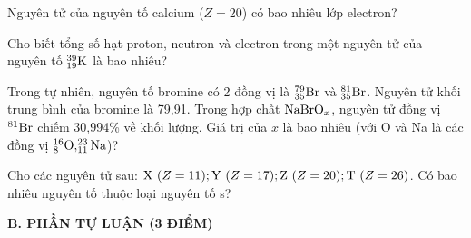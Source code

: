 \documentclass[11pt,a4paper]{article}
\begin{document}
\begin{ex}
Nguyên tử của nguyên tố calcium ($Z = 20$) có bao nhiêu lớp electron?

\end{ex}
\begin{ex}
Cho biết tổng số hạt proton, neutron và electron trong một nguyên tử của nguyên tố $^{39}_{19}\ce{K}$ là bao nhiêu?

\end{ex}
\begin{ex}
Trong tự nhiên, nguyên tố bromine có 2 đồng vị là $^{79}_{35}\ce{Br}$ và $^{81}_{35}\ce{Br}$. Nguyên tử khối trung bình của bromine là 79,91. Trong hợp chất $\ce{NaBrO}_x$, nguyên tử đồng vị $^{81}\ce{Br}$ chiếm 30,994\% về khối lượng. Giá trị của $x$ là bao nhiêu (với O và Na là các đồng vị $^{16}_8\ce{O}, ^{23}_{11}\ce{Na}$)?

\end{ex}
\begin{ex}
Cho các nguyên tử sau: $\ce{X}\ (Z = 11); \ce{Y}\ (Z = 17); \ce{Z}\ (Z = 20); \ce{T}\ (Z = 26)$. Có bao nhiêu nguyên tố thuộc loại nguyên tố s?

\end{ex}
\vspace{6pt}
\noindent
{\color{mainGreen}\textbf{\Large B. PHẦN TỰ LUẬN (3 ĐIỂM)}}
\vspace{3pt}
\end{document}
